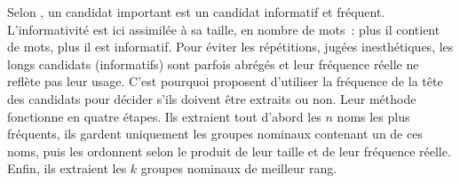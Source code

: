         Selon , un candidat important est un
        candidat informatif et fréquent. L'informativité est ici assimilée à sa
        taille, en nombre de mots~: plus il contient de mots, plus il est
        informatif. Pour éviter les répétitions, jugées inesthétiques, les longs
        candidats (informatifs) sont parfois abrégés et leur fréquence réelle ne
        reflète pas leur usage. C'est pourquoi
         proposent d'utiliser la fréquence de
        la tête des candidats pour décider s'ils doivent être extraits ou non.
        Leur méthode fonctionne en quatre étapes. Ils extraient tout d'abord les
        $n$ noms les plus fréquents, ils gardent uniquement les groupes nominaux
        contenant un de ces noms, puis les ordonnent selon le produit de leur
        taille et de leur fréquence réelle. Enfin, ils extraient les $k$ groupes
        nominaux de meilleur rang.

